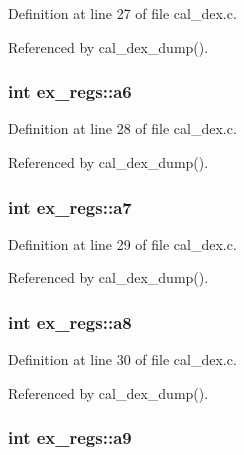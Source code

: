 Definition at line 27 of file cal\-\_\-dex.\-c.



Referenced by cal\-\_\-dex\-\_\-dump().

\hypertarget{structex__regs_a23fa5fa94f11950e7320393beb830618}{
\subsubsection[{a6}]{\setlength{\rightskip}{0pt plus 5cm}int ex\-\_\-regs\-::a6}}\label{structex__regs_a23fa5fa94f11950e7320393beb830618}


Definition at line 28 of file cal\-\_\-dex.\-c.



Referenced by cal\-\_\-dex\-\_\-dump().

\hypertarget{structex__regs_a73f04b635c3699e9b83fadeacdb1eda2}{
\subsubsection[{a7}]{\setlength{\rightskip}{0pt plus 5cm}int ex\-\_\-regs\-::a7}}\label{structex__regs_a73f04b635c3699e9b83fadeacdb1eda2}


Definition at line 29 of file cal\-\_\-dex.\-c.



Referenced by cal\-\_\-dex\-\_\-dump().

\hypertarget{structex__regs_a4a700b056da9b3ea0917603b9c4f9b28}{
\subsubsection[{a8}]{\setlength{\rightskip}{0pt plus 5cm}int ex\-\_\-regs\-::a8}}\label{structex__regs_a4a700b056da9b3ea0917603b9c4f9b28}


Definition at line 30 of file cal\-\_\-dex.\-c.



Referenced by cal\-\_\-dex\-\_\-dump().

\hypertarget{structex__regs_a513f72e66ad69090bdbb06fb37f177d1}{
\subsubsection[{a9}]{\setlength{\rightskip}{0pt plus 5cm}int ex\-\_\-regs\-::a9}}\label{structex__regs_a513f72e66ad69090bdbb06fb37f177d1}


